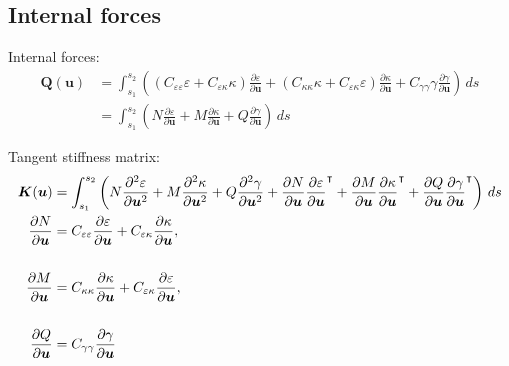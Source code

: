 \subsection{Internal forces}

Internal forces:
%
\begin{align}
\boldsymbol{Q}(\boldsymbol{u}) &= \int_{s_1}^{s_2}\left( \left(C_{\varepsilon\varepsilon}\varepsilon + C_{\varepsilon\kappa}\kappa\right)\frac{\partial\varepsilon}{\partial\boldsymbol{u}} + \left(C_{\kappa\kappa}\kappa + C_{\varepsilon\kappa}\varepsilon\right)\frac{\partial\kappa}{\partial\boldsymbol{u}} + C_{\gamma\gamma}\gamma\frac{\partial\gamma}{\partial\boldsymbol{u}} \right)\,ds \\
&= \int_{s_1}^{s_2}\left( N\frac{\partial\varepsilon}{\partial\boldsymbol{u}} + M\frac{\partial\kappa}{\partial\boldsymbol{u}} + Q\frac{\partial\gamma}{\partial\boldsymbol{u}} \right)\,ds
\end{align}

Tangent stiffness matrix:
%
\begin{align}
\boldsymbol{K}(\boldsymbol{u}) &= \int_{s_1}^{s_2}\left( N\frac{\partial^2\varepsilon}{\partial\boldsymbol{u}^2} + M\frac{\partial^2\kappa}{\partial\boldsymbol{u}^2} + Q\frac{\partial^2\gamma}{\partial\boldsymbol{u}^2} + \frac{\partial N}{\partial\boldsymbol{u}}\frac{\partial\varepsilon}{\partial\boldsymbol{u}}^\intercal + \frac{\partial M}{\partial\boldsymbol{u}}\frac{\partial\kappa}{\partial\boldsymbol{u}}^\intercal + \frac{\partial Q}{\partial\boldsymbol{u}}\frac{\partial\gamma}{\partial\boldsymbol{u}}^\intercal \right)\,ds \\
\frac{\partial N}{\partial\boldsymbol{u}} &= C_{\varepsilon\varepsilon}\frac{\partial\varepsilon}{\partial\boldsymbol{u}} + C_{\varepsilon\kappa}\frac{\partial\kappa}{\partial\boldsymbol{u}}, \\
\notag \\
\frac{\partial M}{\partial\boldsymbol{u}} &= C_{\kappa\kappa}\frac{\partial\kappa}{\partial\boldsymbol{u}} + C_{\varepsilon\kappa}\frac{\partial\varepsilon}{\partial\boldsymbol{u}}, \\
\notag \\
\frac{\partial Q}{\partial\boldsymbol{u}} &= C_{\gamma\gamma}\frac{\partial\gamma}{\partial\boldsymbol{u}}
\end{align}

